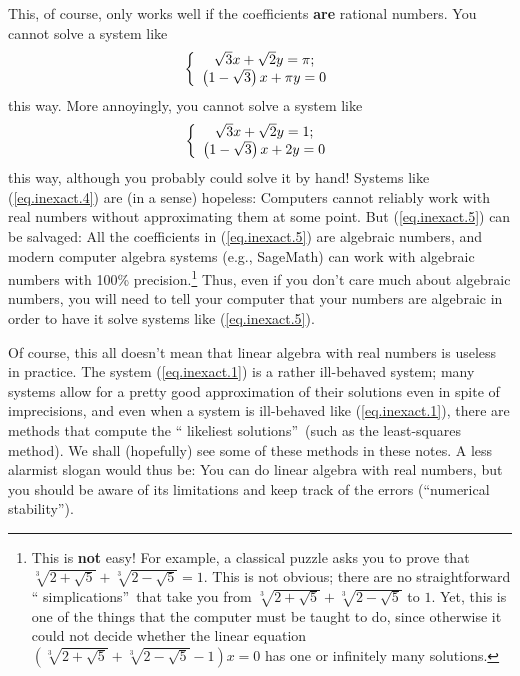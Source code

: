 \documentclass[numbers=enddot,12pt,final,onecolumn,notitlepage]{scrartcl}%
\theoremstyle{definition}
\begin{document}
\begin{itemize}
This, of course, only works well if the coefficients \textbf{are} rational
numbers. You cannot solve a system like%
\begin{equation}
\left\{
\begin{array}
[c]{c}%
\sqrt{3}x+\sqrt{2}y=\pi;\\
\left(  1-\sqrt{3}\right)  x+\pi y=0
\end{array}
\right.  \label{eq.inexact.4}%
\end{equation}
this way. More annoyingly, you cannot solve a system like%
\begin{equation}
\left\{
\begin{array}
[c]{c}%
\sqrt{3}x+\sqrt{2}y=1;\\
\left(  1-\sqrt{3}\right)  x+2y=0
\end{array}
\right.  \label{eq.inexact.5}%
\end{equation}
this way, although you probably could solve it by hand! Systems like
(\ref{eq.inexact.4}) are (in a sense) hopeless: Computers cannot reliably work
with real numbers without approximating them at some point. But
(\ref{eq.inexact.5}) can be salvaged: All the coefficients in
(\ref{eq.inexact.5}) are algebraic numbers, and modern computer algebra
systems (e.g., SageMath) can work with algebraic numbers with 100\%
precision.\footnote{This is \textbf{not} easy! For example, a classical puzzle
asks you to prove that $\sqrt[3]{2+\sqrt{5}}+\sqrt[3]{2-\sqrt{5}}=1$. This is
not obvious; there are no straightforward \textquotedblleft
simplications\textquotedblright\ that take you from $\sqrt[3]{2+\sqrt{5}%
}+\sqrt[3]{2-\sqrt{5}}$ to $1$. Yet, this is one of the things that the
computer must be taught to do, since otherwise it could not decide whether the
linear equation $\left(  \sqrt[3]{2+\sqrt{5}}+\sqrt[3]{2-\sqrt{5}}-1\right)
x=0$ has one or infinitely many solutions.} Thus, even if you don't care much
about algebraic numbers, you will need to tell your computer that your numbers
are algebraic in order to have it solve systems like (\ref{eq.inexact.5}).

Of course, this all doesn't mean that linear algebra with real numbers is
useless in practice. The system (\ref{eq.inexact.1}) is a rather ill-behaved
system; many systems allow for a pretty good approximation of their solutions
even in spite of imprecisions, and even when a system is ill-behaved like
(\ref{eq.inexact.1}), there are methods that compute the \textquotedblleft
likeliest solutions\textquotedblright\ (such as the least-squares method). We
shall (hopefully) see some of these methods in these notes. A less alarmist
slogan would thus be: You can do linear algebra with real numbers, but you
should be aware of its limitations and keep track of the errors
(\textquotedblleft numerical stability\textquotedblright).
\end{itemize}
\end{document}
